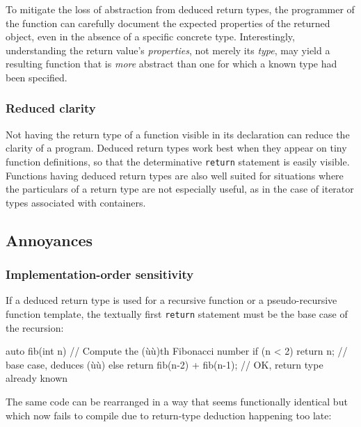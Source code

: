To mitigate the loss of abstraction from deduced return types, the
programmer of the function can carefully document the expected
properties of the returned object, even in the absence of a specific
concrete type. Interestingly, understanding the return value's
\emph{properties}, not merely its \emph{type}, may yield a resulting
function that is \emph{more} abstract than one for which a known type
had been specified.

\subsubsection[Reduced clarity]{Reduced clarity}\label{reduced-clarity}

Not having the return type of a function visible in its declaration can
reduce the clarity of a program. Deduced return types work best when
they appear on tiny function definitions, so that the determinative
\lstinline!return! statement is easily visible. Functions having deduced
return types are also well suited for situations where the particulars
of a return type are not especially useful, as in the case of iterator
types associated with containers.

\subsection[Annoyances]{Annoyances}\label{annoyances}

\subsubsection[Implementation-order sensitivity]{Implementation-order sensitivity}\label{implementation-order-sensitivity}

If a deduced return type is used for a recursive function or a
pseudo-recursive function template, the textually first \lstinline!return!
statement must be the base case of the recursion:

\begin{emcppslisting}[emcppsbatch=e7,emcppsstandards={c++14}]
auto fib(int n)
    // Compute the (ù{}ù)th Fibonacci number
{
    if (n < 2) { return n; }              // base case, deduces (ù{}ù)
    else { return fib(n-2) + fib(n-1); }  // OK, return type already known
}
\end{emcppslisting}
    

\noindent The same code can be rearranged in a way that seems functionally
identical but which now fails to compile due to return-type deduction
happening too late:

